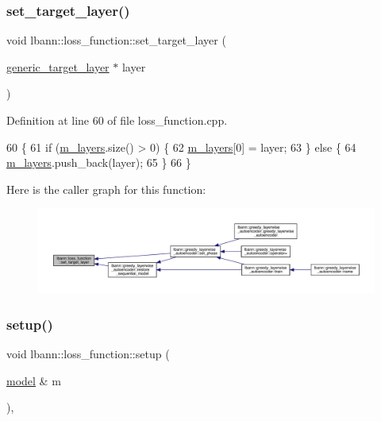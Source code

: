 \subsubsection{\texorpdfstring{set\+\_\+target\+\_\+layer()}{set\_target\_layer()}}
{\footnotesize\ttfamily void lbann\+::loss\+\_\+function\+::set\+\_\+target\+\_\+layer (\begin{DoxyParamCaption}\item[{\hyperlink{classlbann_1_1generic__target__layer}{generic\+\_\+target\+\_\+layer} $\ast$}]{layer }\end{DoxyParamCaption})}



Definition at line 60 of file loss\+\_\+function.\+cpp.


\begin{DoxyCode}
60                                                                 \{
61   \textcolor{keywordflow}{if} (\hyperlink{classlbann_1_1objective__function__term_a9269cf0a237eacd1e220ba2739f44334}{m\_layers}.size() > 0) \{
62     \hyperlink{classlbann_1_1objective__function__term_a9269cf0a237eacd1e220ba2739f44334}{m\_layers}[0] = layer;
63   \} \textcolor{keywordflow}{else} \{
64     \hyperlink{classlbann_1_1objective__function__term_a9269cf0a237eacd1e220ba2739f44334}{m\_layers}.push\_back(layer);
65   \}
66 \}
\end{DoxyCode}
Here is the caller graph for this function\+:\nopagebreak
\begin{figure}[H]
\begin{center}
\leavevmode
\includegraphics[width=350pt]{classlbann_1_1loss__function_a9ef5356468c892c2c0221f8acd6b5471_icgraph}
\end{center}
\end{figure}
\mbox{\label{classlbann_1_1loss__function_a17a3629e8519c4215ad776a0c7b522ae}} 
\subsubsection{\texorpdfstring{setup()}{setup()}}
{\footnotesize\ttfamily void lbann\+::loss\+\_\+function\+::setup (\begin{DoxyParamCaption}\item[{\hyperlink{classlbann_1_1model}{model} \&}]{m }\end{DoxyParamCaption})\hspace{0.3cm}{\ttfamily [override]}, {\ttfamily [virtual]}}

